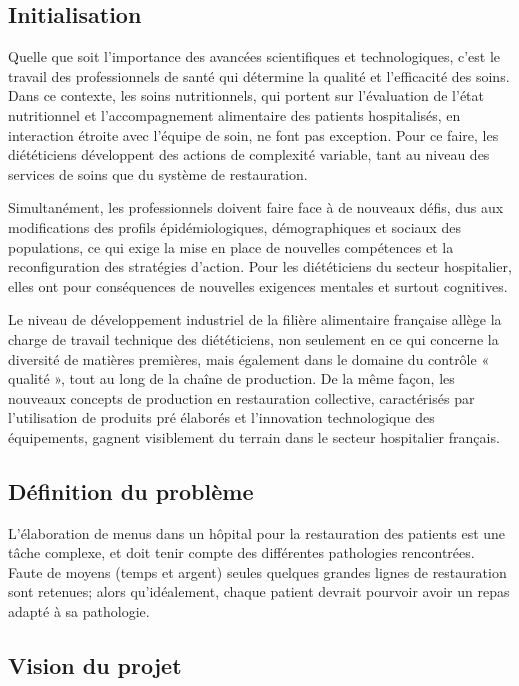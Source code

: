 \textcolor[RGB]{46, 116, 181}{\chapter{Initialisation}}
Quelle que soit l’importance des avancées scientifiques et technologiques, c’est le travail des
professionnels de santé qui détermine la qualité et l’efficacité des soins. Dans ce contexte, les soins
nutritionnels, qui portent sur l’évaluation de l’état nutritionnel et l’accompagnement alimentaire des
patients hospitalisés, en interaction étroite avec l’équipe de soin, ne font pas exception. Pour ce
faire, les diététiciens développent des actions de complexité variable, tant au niveau des services de
soins que du système de restauration.

Simultanément, les professionnels doivent faire face à de nouveaux défis, dus aux modifications des
profils épidémiologiques, démographiques et sociaux des populations, ce qui exige la mise en place
de nouvelles compétences et la reconfiguration des stratégies d’action. Pour les diététiciens du
secteur hospitalier, elles ont pour conséquences de nouvelles exigences mentales et surtout
cognitives.

Le niveau de développement industriel de la filière alimentaire française allège la charge de travail
technique des diététiciens, non seulement en ce qui concerne la diversité de matières premières,
mais également dans le domaine du contrôle « qualité », tout au long de la chaîne de production. De
la même façon, les nouveaux concepts de production en restauration collective, caractérisés par
l’utilisation de produits pré élaborés et l’innovation technologique des équipements, gagnent
visiblement du terrain dans le secteur hospitalier français.

\section{Définition du problème}
L'élaboration de menus dans un hôpital pour la restauration des patients
est une tâche complexe, et doit tenir compte des différentes pathologies
rencontrées. Faute de moyens (temps et argent) seules quelques grandes
lignes de restauration sont retenues; alors qu'idéalement, chaque
patient devrait pourvoir avoir un repas adapté à sa pathologie.

\section{Vision du projet}
